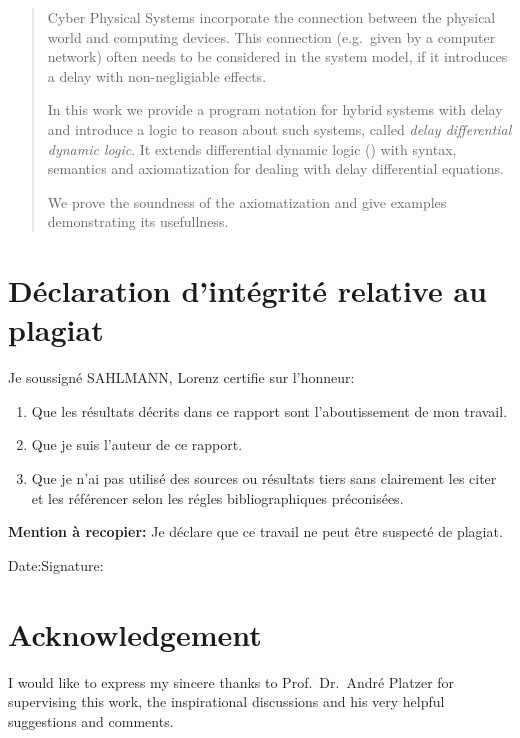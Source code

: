 \begin{abstract}
    Cyber Physical Systems incorporate the connection between the physical world and computing devices.
    This connection (e.g.\ given by a computer network) often needs to be considered in the system model, if it introduces a delay with non-negligiable effects.

    In this work we provide a program notation for hybrid systems with delay and introduce a logic to reason about such systems, called \emph{delay differential dynamic logic}.
    It extends differential dynamic logic (\dL) with syntax, semantics and axiomatization for dealing with delay differential equations.

    We prove the soundness of the axiomatization and give examples demonstrating its usefullness.


\end{abstract}

\begin{otherlanguage}{frenchb}
    \chapter*{Déclaration d’intégrité relative au plagiat}

    Je soussigné SAHLMANN, Lorenz certifie sur l’honneur:
    \begin{enumerate}
        \item Que les résultats décrits dans ce rapport sont l’aboutissement de mon travail.
        \item Que je suis l’auteur de ce rapport.
        \item Que je n’ai pas utilisé des sources ou résultats tiers sans clairement les citer et les référencer selon les régles bibliographiques préconisées.
    \end{enumerate}

    \textbf{Mention à recopier:}
    Je déclare que ce travail ne peut être suspecté de plagiat.

    \vspace{2cm}
    Date:\hfil Signature:

\end{otherlanguage}

\cleardoublepage

\chapter*{Acknowledgement}
    I would like to express my sincere thanks to Prof.~Dr.~André Platzer for supervising this work, the inspirational discussions and his very helpful suggestions and comments.

